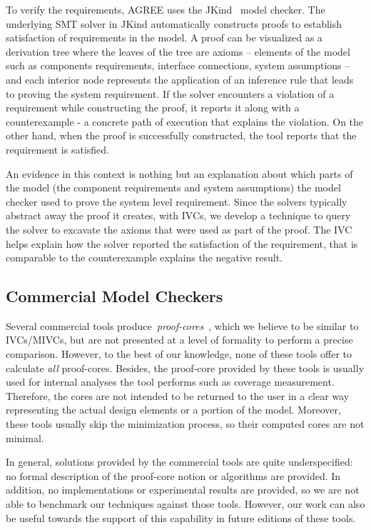 To verify the requirements, AGREE uses the JKind~\cite{jkind} model checker. The underlying SMT solver in JKind automatically constructs proofs to establish satisfaction of requirements in the model. A proof can be visualized as a derivation tree where the leaves of the tree are axioms -- elements of the model such as components requirements, interface connections, system assumptions -- and each interior node represents the application of an inference rule that leads to proving the system requirement. If the solver encounters a violation of a requirement while constructing the proof, it reports it along with a counterexample - a concrete path of execution that explains the violation. On the other hand, when the proof is successfully constructed, the tool reports that the requirement is satisfied.

An evidence in this context is nothing but an
explanation about which parts of the model (the component requirements and system assumptions) the
model checker used to prove the system level requirement. Since the solvers typically abstract away the proof it creates, with IVCs, we develop a technique to query the solver to excavate the axioms that were used as part of the proof. The IVC helps explain how the solver reported the satisfaction of the requirement, that is comparable to the counterexample explains the negative result.



\subsection{Commercial Model Checkers}
Several commercial tools produce~\emph{proof-cores}~\cite{hanna2015formal, jasper_gold}, which we believe to be similar to IVCs/MIVCs, but are not presented at a level of formality to perform a precise comparison.  However, to the best of our knowledge, none of these tools offer to calculate \emph{all} proof-cores. Besides, the proof-core provided by these tools is usually used for internal analyses the tool performs such as coverage measurement. Therefore, the cores are not intended to be returned to the user in a clear way representing the actual design elements or a portion of the model. Moreover, these tools usually skip the minimization process, so their computed cores are not minimal.

In general, solutions provided by the commercial tools are quite underspecified:
no formal description of the proof-core notion or algorithms are provided. In addition, no implementations or experimental results are provided, so we are not able to benchmark our techniques against those tools. However, our work can also be useful towards the support of this capability in future editions of these tools.

